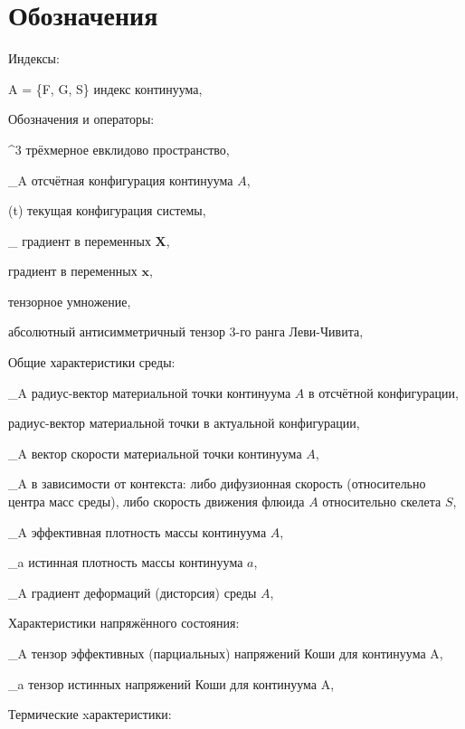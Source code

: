\section*{Обозначения}
\setcounter{subsection}{0}
	
	Индексы:
\begin{where}
	\item [A = \{F, G, S\}] индекс континуума,
\end{where}

	Обозначения и операторы:
\begin{where}
	\item [\mathbb{E}^3] трёхмерное евклидово пространство,
	\item [\kappa_A] отсчётная конфигурация континуума $A$,
	\item [\chi(t)] текущая конфигурация системы,
	\item [\nabla_{\kappa}] градиент в переменных $\boldsymbol{X}$,
	\item [\nabla] градиент в переменных $\boldsymbol{x}$,
	\item [\otimes] тензорное умножение,
	\item [\boldsymbol{\varepsilon}] абсолютный антисимметричный тензор 3-го ранга Леви-Чивита,
\end{where}

	Общие характеристики среды:
\begin{where}
	\item [\boldsymbol{X}_A] радиус-вектор материальной точки континуума $A$ в отсчётной конфигурации,
	\item [\boldsymbol{x}] радиус-вектор материальной точки в актуальной конфигурации,
	\item [\boldsymbol{v}_A] вектор скорости материальной точки континуума $A$,
	\item [\boldsymbol{w}_A] в зависимости от контекста: либо дифузионная скорость (относительно центра масс среды), либо скорость движения флюида $A$ относительно скелета $S$,
	\item [\rho_A] эффективная плотность массы континуума $A$,
	\item [\rho_a] истинная плотность массы континуума $a$,
	\item [\boldsymbol{F}_A] градиент деформаций (дисторсия) среды $A$,
\end{where}

	Характеристики напряжённого состояния:
\begin{where}
	\item [\boldsymbol{\sigma}_A] тензор эффективных (парциальных) напряжений Коши для континуума A,
	\item [\boldsymbol{\sigma}_a] тензор истинных напряжений Коши для континуума A,
\end{where}

	Термические xарактеристики:

